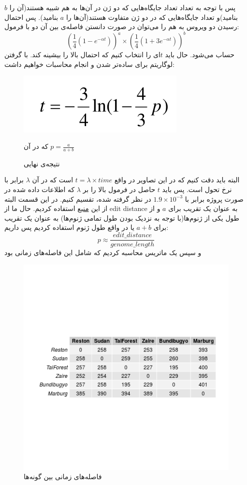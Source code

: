 \documentclass[11pt]{article}
\begin{document}
پس با توجه به تعداد تعداد جایگاه‌هایی که دو ژن در آن‌ها به هم شبیه هستند(آن را $b$ بنامید)و تعداد جایگاه‌هایی که در دو ژن متفاوت هستند(آن‌ها را $a$ بنامید). پس احتمال رسیدن دو ویروس به هم را می‌توان در صورت دانستن فاصله‌ی بین آن دو با فرمول:
$$(\frac{1}{4}(1-e^{-\alpha t}))^a\times (\frac{1}{4}(1+3e^{-\alpha t}))^b$$
حساب می‌شود. حال باید $t$‌ای را انتخاب کنیم که احتمال بالا را بیشینه کند. با گرفتن لوگاریتم برای ساده‌تر شدن و انجام محاسبات خواهیم داشت:
\begin{figure}[H]
  \centering
  \includegraphics[width=\linewidth]{end_result.png}
  \caption{ 
نتیجه‌ی نهایی
  }
  که در آن 
  $p =\frac{a}{a+b}$
\end{figure}
 البته باید دقت کنیم که در این تصاویر در واقع
 $t = \lambda \times time$
 است که در آن $\lambda$ برابر با نرخ تحول است. پس باید $t$ حاصل در فرمول بالا را بر $\lambda$ که اطلاعات داده شده در صورت پروژه برابر با 
 $1.9\times 10^{-3}$
 در نظر گرفته شده، تقسیم کنیم.
  در این قسمت البته از این 
  \href{http://www.montefiore.ulg.ac.be/~kvansteen/GBIO0009-1/ac20132014/T4/jc.pdf}{منبع}
  استفاده کردیم. حال ما از edit distance به عنوان یک تقریب برای $a$ و از طول یکی از ژنوم‌ها(با توجه به نزدیک بودن طول تمامی ژنوم‌ها) به عنوان یک تقریب برای $a+b$ یا در واقع طول ژنوم استفاده کردیم پس داریم:
  $$p \approx \frac{edit\_distance}{genome\_length}$$
  و سپس یک ماتریس محاسبه کردیم که شامل این فاصله‌های زمانی بود
  \begin{figure}[H]
  \centering
  \includegraphics[width=\linewidth]{../Data/Trees/time_matrix.png}
  \caption{ 
فاصله‌‌های زمانی بین گونه‌ها
  }
\end{figure}
\end{document}
